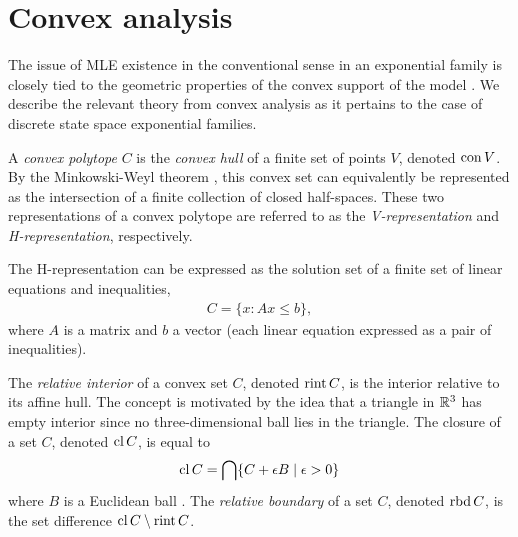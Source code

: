

\section{Convex analysis} \label{S:Convex analysis}
The issue of MLE existence in the conventional sense in an exponential family is 
closely tied to the geometric properties of 
the convex support of the model \citep{Barndorff, Geyer:gdor, Rinaldo:2009}.  We 
describe the relevant theory from convex analysis as it pertains to the case of 
discrete state space exponential families.

A \emph{convex polytope} $C$ is the \emph{convex hull} of a finite set of points $V$, denoted $\operatorname{con} V$.
By the Minkowski-Weyl theorem \citep[Theorem 19.1]{Rockafellar:1970}, this convex 
set can equivalently be represented as the intersection of a finite collection of 
closed half-spaces.  These two representations of a convex polytope are referred to 
as the \emph{V-representation} and \emph{H-representation}, respectively.  

The H-representation can be expressed as the solution set of a finite set of linear 
equations and inequalities,
\begin{align*}
	C = \{x: Ax \leq b \},
\end{align*}
where $A$ is a matrix and $b$ a vector (each linear equation expressed as a pair of inequalities).

The \emph{relative interior} of a convex set $C$, denoted $\operatorname{rint} C$, is the interior 
relative to its affine hull.  The concept is motivated by the idea that a triangle
in ${\mathbb R}^3$ has empty interior 
since no three-dimensional ball lies in the triangle.  The closure of a set $C$, denoted $\operatorname{cl} C$, is equal to
\begin{align*}
	\operatorname{cl} C = \bigcap \{C + \epsilon B \mid \epsilon > 0 \}
\end{align*}
where $B$ is a Euclidean ball \citep[Section 6]{Rockafellar:1970}.  The \emph{relative boundary} of a set $C$, denoted $\operatorname{rbd} C$, is the set difference $\operatorname{cl} C \setminus \operatorname{rint} C$.

